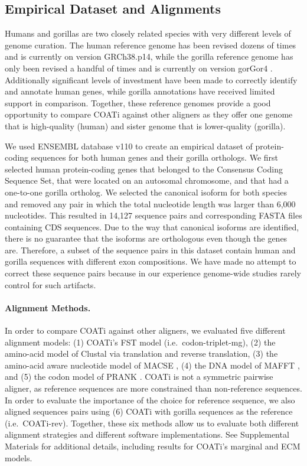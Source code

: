 \documentclass[12pt,letterpaper]{article}
\begin{document}
\subsection*{Empirical Dataset and Alignments}

Humans and gorillas are two closely related species with very different levels of genome curation. The human reference genome has been revised dozens of times and is currently on version GRCh38.p14, while the gorilla reference genome has only been revised a handful of times and is currently on version gorGor4 \citep[cf.\ ENSEMBL database v110;][]{ensembl_hubbard_2002}. Additionally significant levels of investment have been made to correctly identify and annotate human genes, while gorilla annotations have received limited support in comparison. Together, these reference genomes provide a good opportunity to compare COATi against other aligners as they offer one genome that is high-quality (human) and sister genome that is lower-quality (gorilla).

We used ENSEMBL database v110 \citep{ensembl_hubbard_2002} to create an empirical dataset of protein-coding sequences for both human genes and their gorilla orthologs. We first selected human protein-coding genes that belonged to the Consensus Coding Sequence Set, that were located on an autosomal chromosome, and that had a one-to-one gorilla ortholog. We selected the canonical isoform for both species and removed any pair in which the total nucleotide length was larger than 6,000 nucleotides. This resulted in 14,127 sequence pairs and corresponding FASTA files containing CDS sequences. Due to the way that canonical isoforms are identified, there is no guarantee that the isoforms are orthologous even though the genes are. Therefore, a subset of the sequence pairs in this dataset contain human and gorilla sequences with different exon compositions. We have made no attempt to correct these sequence pairs because in our experience genome-wide studies rarely control for such artifacts.

\paragraph{Alignment Methods.}

In order to compare COATi against other aligners, we evaluated five different alignment models: (1) COATi's FST model (i.e.\ codon-triplet-mg), (2) the amino-acid model of Clustal\textOmega{}{} \citep{clustal_omega_sievers_2011} via translation and reverse translation, (3) the amino-acid aware nucleotide model of MACSE \citep{ranwez_macse_2018}, (4) the DNA model of MAFFT \citep{katoh2013mafft}, and (5) the codon model of PRANK \citep{prank_loytynoja_2014}. 
COATi is not a symmetric pairwise aligner, as reference sequences are more constrained than non-reference sequences. In order to evaluate the importance of the choice for reference sequence, we also aligned sequences pairs using (6) COATi with gorilla sequences as the reference (i.e.\ COATi-rev). Together, these six methods allow us to evaluate both different alignment strategies and different software implementations. See Supplemental Materials for additional details, including results for COATi's marginal and ECM models.
\end{document}

